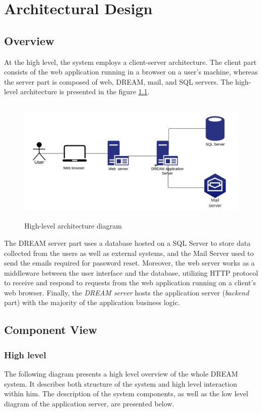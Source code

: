 \chapter{Architectural Design} \label{ch:architectural_design}


\section{Overview}
 At the high level, the system employs a client-server architecture. The client part consists of the web application running in a browser on a user's machine, whereas the server part is composed of web, DREAM, mail, and SQL servers. The high-level architecture is presented in the figure \ref{fig:high-level-architecture}.

\begin{figure}[H]
    \centering
    \includegraphics[width=12cm, height=6cm]
    {figures/Overview.png}
    \caption{High-level architecture diagram}
    \label{fig:high-level-architecture}
\end{figure}

The DREAM server part uses a database hosted on a SQL Server to store data collected from the users as well as external systems, and the Mail Server used to send the emails required for password reset. Moreover, the web server works as a middleware between the user interface and the database, utilizing HTTP protocol to receive and respond to requests from the web application running on a client's web browser. Finally, the \textit{DREAM server} hosts the application server (\textit{backend} part) with the majority of the application business logic. 

\section{Component View} \label{sec:component-view}

\subsection{High level}
The following diagram presents a high level overview of the whole DREAM system. It describes both structure of the system and high level interaction within him. The description of the system components, as well as the low level diagram of the application server, are presented below.

